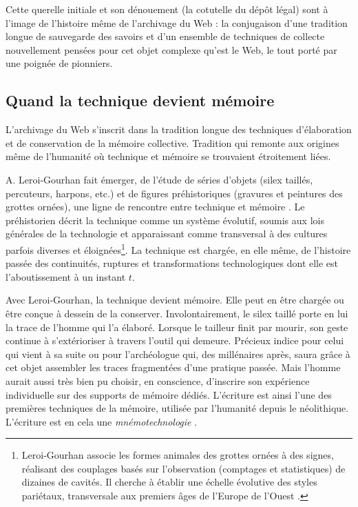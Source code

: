 \documentclass[symmetric,justified,marginals=raggedouter]{tufte-book}
\begin{document}
Cette querelle initiale et son dénouement (la cotutelle du dépôt légal) sont à l'image de l'histoire même de l'archivage du Web : la conjugaison d'une tradition longue de sauvegarde des savoirs et d'un ensemble de techniques de collecte nouvellement pensées pour cet objet complexe qu'est le Web, le tout porté par une poignée de pionniers.

\subsection{Quand la technique devient mémoire}

\noindent L'archivage du Web s'inscrit dans la tradition longue des techniques d'élaboration et de conservation de la mémoire collective. Tradition qui remonte aux origines même de l'humanité où technique et mémoire se trouvaient étroitement liées. 

A. Leroi-Gourhan fait émerger, de l'étude de séries d'objets (silex taillés, percuteurs, harpons, etc.) et de figures préhistoriques (gravures et peintures des grottes ornées), une ligne de rencontre entre technique et mémoire \citep{leroi-gourhan_geste_1964}. Le préhistorien décrit la technique comme un système évolutif, soumis aux lois générales de la technologie et apparaissant comme transversal à des cultures parfois diverses et éloignées\footnote{\RaggedOuter 
Leroi-Gourhan associe les formes animales des grottes ornées à des signes, réalisant des couplages basés sur l'observation (comptages et statistiques) de dizaines de cavités. Il cherche à établir une échelle évolutive des styles pariétaux, transversale aux premiers âges de l'Europe de l'Ouest \citep{leroi-gourham_art_1984}.}. La technique est chargée, en elle même, de l'histoire passée des continuités, ruptures et transformations technologiques dont elle est l'aboutissement à un instant $t$.   

Avec Leroi-Gourhan, la technique devient mémoire. Elle peut en être chargée ou être conçue à dessein de la conserver. Involontairement, le silex taillé porte en lui la trace de l'homme qui l'a élaboré. Lorsque le tailleur finit par mourir, son geste continue à s'extérioriser à travers l'outil qui demeure. Précieux indice pour celui qui vient à sa suite ou pour l'archéologue qui, des millénaires après, saura grâce à cet objet assembler les traces fragmentées d'une pratique passée. Mais l'homme aurait aussi très bien pu choisir, en conscience, d'inscrire son expérience individuelle sur des supports de mémoire dédiés. L'écriture est ainsi l'une des premières techniques de la mémoire, utilisée par l'humanité depuis le néolithique. L'écriture est en cela une \textit{mnémotechnologie} \citep{stiegler_leroi-gourhan:_1998}. 
\end{document}
